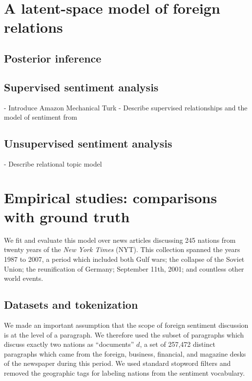 \section{A latent-space model of foreign relations}

\subsection{Posterior inference}

\subsection{Supervised sentiment analysis}

  - Introduce Amazon Mechanical Turk
  - Describe supervised relationships and the model of sentiment from 

\subsection{Unsupervised sentiment analysis}

 - Describe relational topic model

\section{Empirical studies: comparisons with ground truth}

\label{section:experiments}

We fit and evaluate this model over news articles discussing 245
nations from twenty years of the \emph{New York Times} (NYT).  This
collection spanned the years 1987 to 2007, a period which included
both Gulf wars; the collapse of the Soviet Union; the reunification of
Germany; September 11th, 2001; and countless other world events.

\subsection{Datasets and tokenization}  We made an important
assumption that the scope of foreign sentiment discussion is at the
level of a paragraph.  We therefore used the subset of paragraphs
which discuss exactly two nations as ``documents'' $d$, a set of
257,472 distinct paragraphs which came from the foreign, business,
financial, and magazine desks of the newspaper during this period. We
used standard stopword filters and removed the geographic tags for
labeling nations from the sentiment vocabulary.

